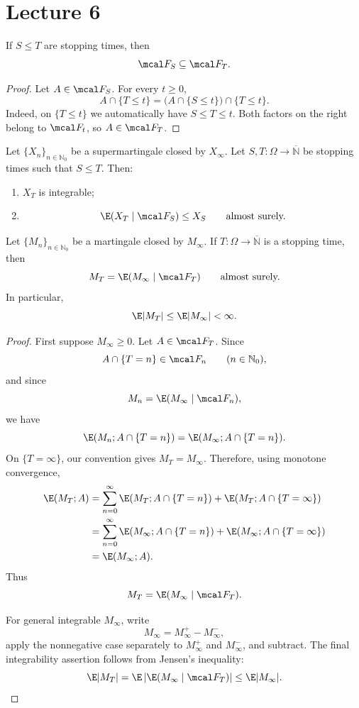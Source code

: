 \section{Lecture 6}

\begin{proposition}
If $S\leq T$ are stopping times, then
\[
    \mcal F_S\subseteq\mcal F_T.
\]
\end{proposition}

\begin{proof}
Let $A\in\mcal F_S$. For every $t\geq 0$,
\[
    A\cap\{T\leq t\}
    =
    \bigl(A\cap\{S\leq t\}\bigr)\cap\{T\leq t\}.
\]
Indeed, on $\{T\leq t\}$ we automatically have $S\leq T\leq t$.
Both factors on the right belong to $\mcal F_t$, so
$A\in\mcal F_T$.
\end{proof}

\begin{theorem}
Let $\{X_n\}_{n\in\mathbb N_0}$ be a supermartingale closed by
$X_\infty$. Let $S,T:\Omega\to\overline{\mathbb N}$ be stopping times
such that $S\leq T$. Then:

\begin{enumerate}
    \item[(i)] $X_T$ is integrable;

    \item[(ii)]
    \[
        \E(X_T\mid\mcal F_S)\leq X_S
        \qquad\text{almost surely.}
    \]
\end{enumerate}
\end{theorem}

\begin{lemma}
Let $\{M_n\}_{n\in\mathbb N_0}$ be a martingale closed by
$M_\infty$. If $T:\Omega\to\overline{\mathbb N}$ is a stopping time,
then
\[
    M_T=\E(M_\infty\mid\mcal F_T)
    \qquad\text{almost surely.}
\]
In particular,
\[
    \E|M_T|\leq \E|M_\infty|<\infty.
\]
\end{lemma}

\begin{proof}
First suppose $M_\infty\geq 0$. Let $A\in\mcal F_T$. Since
\[
    A\cap\{T=n\}\in\mcal F_n
    \qquad(n\in\mathbb N_0),
\]
and since
\[
    M_n=\E(M_\infty\mid\mcal F_n),
\]
we have
\[
    \E(M_n;A\cap\{T=n\})
    =
    \E(M_\infty;A\cap\{T=n\}).
\]
On $\{T=\infty\}$, our convention gives $M_T=M_\infty$. Therefore,
using monotone convergence,
\begin{align*}
    \E(M_T;A)
    &=
    \sum_{n=0}^{\infty}
    \E(M_T;A\cap\{T=n\})
    +
    \E(M_T;A\cap\{T=\infty\}) \\
    &=
    \sum_{n=0}^{\infty}
    \E(M_\infty;A\cap\{T=n\})
    +
    \E(M_\infty;A\cap\{T=\infty\}) \\
    &=
    \E(M_\infty;A).
\end{align*}
Thus
\[
    M_T=\E(M_\infty\mid\mcal F_T).
\]

For general integrable $M_\infty$, write
\[
    M_\infty=M_\infty^+-M_\infty^-,
\]
apply the nonnegative case separately to $M_\infty^+$ and
$M_\infty^-$, and subtract. The final integrability assertion follows
from Jensen's inequality:
\[
    \E|M_T|
    =
    \E\left|\E(M_\infty\mid\mcal F_T)\right|
    \leq \E|M_\infty|.
\]
\end{proof}

